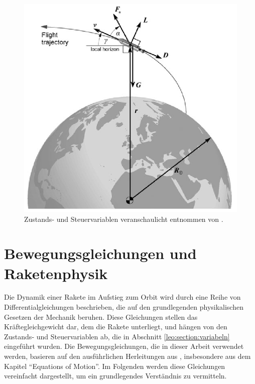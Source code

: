 \begin{figure}
	\centering
	\includegraphics[width=0.65\linewidth]{papers/leo/Grafiken/forces.png}
	\caption{Zustands- und Steuervariablen veranschaulicht entnommen von \cite{leo:astronautics}.}
	\label{fig:leo:forces}
\end{figure}



\section{Bewegungsgleichungen und Raketenphysik \label{leo:section:beweungsgleichungen}}

Die Dynamik einer Rakete im Aufstieg zum Orbit wird durch eine Reihe von Differentialgleichungen beschrieben, die auf den grundlegenden physikalischen Gesetzen der Mechanik beruhen. 
Diese Gleichungen stellen das Kräftegleichgewicht dar, dem die Rakete unterliegt, und hängen von den Zustands- und Steuervariablen ab, die in Abschnitt \ref{leo:section:variabeln} eingeführt wurden. 
Die Bewegungsgleichungen, die in dieser Arbeit verwendet werden, basieren auf den ausführlichen Herleitungen aus \cite{leo:astronautics}, insbesondere aus dem Kapitel ``Equations of Motion''. 
Im Folgenden werden diese Gleichungen vereinfacht dargestellt, um ein grundlegendes Verständnis zu vermitteln.

